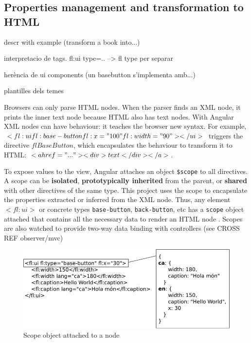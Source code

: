 \subsection{Properties management and transformation to \ac{HTML}}
descr with example (transform a  book into...)

interpretacio de tags. fl:ui type=.. --> fl {type} per separar

herència de ui components (un basebutton s'implementa amb...)

plantilles dels temes

Browsers can only parse \ac{HTML} nodes.
When the parser finds an \ac{XML} node, it prints the inner text node because \ac{HTML} also has text nodes.
With Angular \ac{XML} nodes can have behaviour: it teaches the browser new syntax.
For example, $<fl:ui fl:base-button fl:x="100" fl:width="90"></ui>$ triggers the directive $flBaseButton$, which encapsulates the behaviour to transform it to \ac{HTML}: $<a href="..."><div>text</div></a>$.

To expose values to the view, Angular attaches an object \texttt{\$scope} to all directives.
A scope can be \textbf{isolated}, \textbf{prototypically inherited} from the parent, or \textbf{shared} with other directives of the same type.
This project uses the scope to encapsulate the properties extracted or inferred from the \ac{XML} node.
Thus, any element \texttt{$<fl:ui>$} or concrete types \texttt{base-button}, \texttt{back-button}, etc has a \texttt{scope} object attached that contains all the necessary data to render an \ac{HTML} node .
Scopes are also watched to provide two-way data binding with controllers (see CROSS REF observer/mvc)

\begin{figure}[htb]
    \centering
    \includegraphics{figures/design/properties-management.pdf}
    \caption{Scope object attached to a node}
    \label{fig:design-properties-management}
\end{figure}


